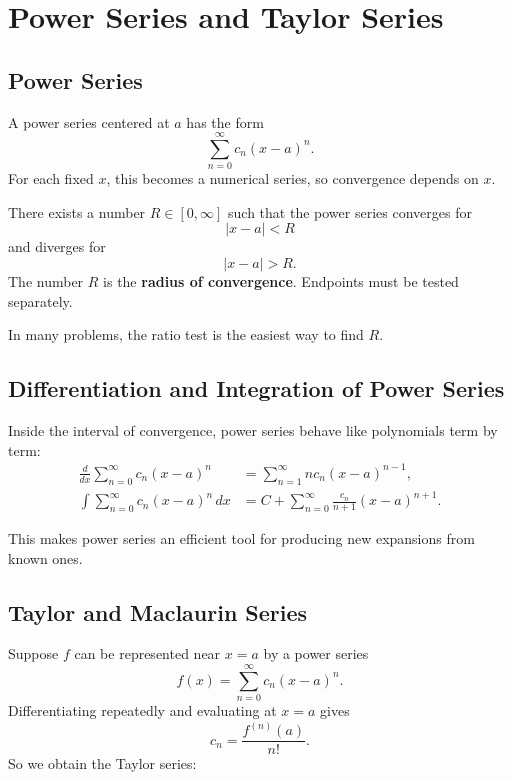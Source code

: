 \chapter*{Power Series and Taylor Series}

\section*{Power Series}

A power series centered at $a$ has the form
$$\sum_{n=0}^{\infty} c_n(x-a)^n.$$ 
For each fixed $x$, this becomes a numerical series, so convergence depends on $x$.

\begin{definition}
There exists a number $R\in[0,\infty]$ such that the power series converges for
$$|x-a|<R$$
and diverges for
$$|x-a|>R.$$ 
The number $R$ is the \textbf{radius of convergence}. Endpoints must be tested separately.
\end{definition}

In many problems, the ratio test is the easiest way to find $R$.

\section*{Differentiation and Integration of Power Series}

Inside the interval of convergence, power series behave like polynomials term by term:
\begin{align*}
\frac{d}{dx}\sum_{n=0}^{\infty} c_n(x-a)^n &= \sum_{n=1}^{\infty} n c_n(x-a)^{n-1}, \\
\int \sum_{n=0}^{\infty} c_n(x-a)^n\,dx &= C + \sum_{n=0}^{\infty} \frac{c_n}{n+1}(x-a)^{n+1}.
\end{align*}

This makes power series an efficient tool for producing new expansions from known ones.

\section*{Taylor and Maclaurin Series}

Suppose $f$ can be represented near $x=a$ by a power series
$$f(x)=\sum_{n=0}^{\infty} c_n(x-a)^n.$$ 
Differentiating repeatedly and evaluating at $x=a$ gives
$$c_n = \frac{f^{(n)}(a)}{n!}.$$ 
So we obtain the Taylor series:

